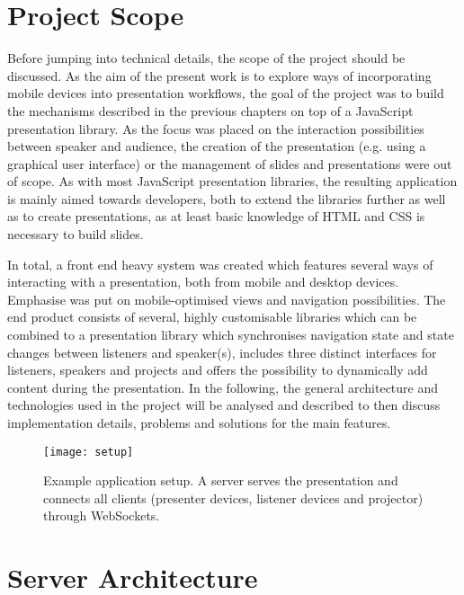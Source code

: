 \section{Project Scope}
\label{sec:implementation-scope}
Before jumping into technical details, the scope of the project should be discussed. As the aim of the present work is to explore ways of incorporating mobile devices into presentation workflows, the goal of the project was to build the mechanisms described in the previous chapters on top of a JavaScript presentation library. As the focus was placed on the interaction possibilities between speaker and audience, the creation of the presentation (e.g. using a graphical user interface) or the management of slides and presentations were out of scope. As with most JavaScript presentation libraries, the resulting application is mainly aimed towards developers, both to extend the libraries further as well as to create presentations, as at least basic knowledge of HTML and CSS is necessary to build slides.

In total, a front end heavy system was created which features several ways of interacting with a presentation, both from mobile and desktop devices. Emphasise was put on mobile-optimised views and navigation possibilities. The end product consists of several, highly customisable libraries which can be combined to a presentation library which synchronises navigation state and state changes between listeners and speaker(s), includes three distinct interfaces for listeners, speakers and projects and offers the possibility to dynamically add content during the presentation. In the following, the general architecture and technologies used in the project will be analysed and described to then discuss implementation details, problems and solutions for the main features.

\begin{figure}
\centering
\texttt{[image: setup]}
\caption{Example application setup. A server serves the presentation and connects all clients (presenter devices, listener devices and projector) through WebSockets.}
\label{fig:implementation-architecture-setup}
\end{figure}

\section{Server Architecture}
\label{sec:implementation-server}

